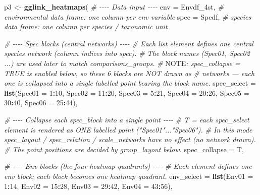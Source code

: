\documentclass[
]{book}
\newenvironment{Shaded}{\begin{snugshade}}{\end{snugshade}}
\newcommand{\AlertTok}[1]{\textcolor[rgb]{0.94,0.16,0.16}{#1}}
\newcommand{\AttributeTok}[1]{\textcolor[rgb]{0.13,0.29,0.53}{#1}}
\newcommand{\CommentTok}[1]{\textcolor[rgb]{0.56,0.35,0.01}{\textit{#1}}}
\newcommand{\DecValTok}[1]{\textcolor[rgb]{0.00,0.00,0.81}{#1}}
\newcommand{\FunctionTok}[1]{\textcolor[rgb]{0.13,0.29,0.53}{\textbf{#1}}}
\newcommand{\NormalTok}[1]{#1}
\newcommand{\OtherTok}[1]{\textcolor[rgb]{0.56,0.35,0.01}{#1}}
\newcommand{\SpecialCharTok}[1]{\textcolor[rgb]{0.81,0.36,0.00}{\textbf{#1}}}
\begin{document}
\begin{Shaded}
\begin{Highlighting}[]
\NormalTok{p3 }\OtherTok{\textless{}{-}} \FunctionTok{gglink\_heatmaps}\NormalTok{(}
  \CommentTok{\# {-}{-}{-}{-} Data input {-}{-}{-}{-}}
  \AttributeTok{env                =}\NormalTok{ Envdf\_4st,            }\CommentTok{\# environmental data frame: one column per env variable}
  \AttributeTok{spec               =}\NormalTok{ Spedf,                }\CommentTok{\# species data frame: one column per species / taxonomic unit}

  \CommentTok{\# {-}{-}{-}{-} Spec blocks (central networks) {-}{-}{-}{-}}
  \CommentTok{\# Each list element defines one central species network (column indices into \textasciigrave{}spec\textasciigrave{}).}
  \CommentTok{\# The block names (Spec01, Spec02 ...) are used later to match \textasciigrave{}comparisons\_groups\textasciigrave{}.}
  \CommentTok{\# }\AlertTok{NOTE}\CommentTok{: spec\_collapse = TRUE is enabled below, so these 6 blocks are NOT drawn as}
  \CommentTok{\#       networks — each one is collapsed into a single labelled point bearing the block name.}
  \AttributeTok{spec\_select        =} \FunctionTok{list}\NormalTok{(}\AttributeTok{Spec01 =} \DecValTok{1}\SpecialCharTok{:}\DecValTok{10}\NormalTok{,}
                            \AttributeTok{Spec02 =} \DecValTok{11}\SpecialCharTok{:}\DecValTok{20}\NormalTok{,}
                            \AttributeTok{Spec03 =} \DecValTok{5}\SpecialCharTok{:}\DecValTok{21}\NormalTok{,}
                            \AttributeTok{Spec04 =} \DecValTok{20}\SpecialCharTok{:}\DecValTok{26}\NormalTok{,}
                            \AttributeTok{Spec05 =} \DecValTok{30}\SpecialCharTok{:}\DecValTok{40}\NormalTok{,}
                            \AttributeTok{Spec06 =} \DecValTok{25}\SpecialCharTok{:}\DecValTok{44}\NormalTok{),}

  \CommentTok{\# {-}{-}{-}{-} Collapse each spec\_block into a single point {-}{-}{-}{-}}
  \CommentTok{\# T = each spec\_select element is rendered as ONE labelled point ("Spec01"..."Spec06").}
  \CommentTok{\# In this mode spec\_layout / spec\_relation / scale\_networks have no effect (no network drawn).}
  \CommentTok{\# The point positions are decided by \textasciigrave{}group\_layout\textasciigrave{} below.}
  \AttributeTok{spec\_collapse      =}\NormalTok{ T,}

  \CommentTok{\# {-}{-}{-}{-} Env blocks (the four heatmap quadrants) {-}{-}{-}{-}}
  \CommentTok{\# Each element defines one env block; each block becomes one heatmap quadrant.}
  \AttributeTok{env\_select         =} \FunctionTok{list}\NormalTok{(}\AttributeTok{Env01 =} \DecValTok{1}\SpecialCharTok{:}\DecValTok{14}\NormalTok{,}
                            \AttributeTok{Env02 =} \DecValTok{15}\SpecialCharTok{:}\DecValTok{28}\NormalTok{,}
                            \AttributeTok{Env03 =} \DecValTok{29}\SpecialCharTok{:}\DecValTok{42}\NormalTok{,}
                            \AttributeTok{Env04 =} \DecValTok{43}\SpecialCharTok{:}\DecValTok{56}\NormalTok{),}


\end{Highlighting}
\end{Shaded}
\end{document}
